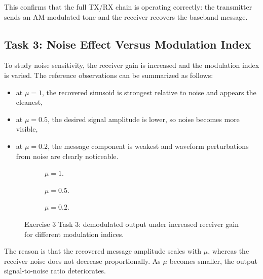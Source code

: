This confirms that the full TX/RX chain is operating correctly: the transmitter
sends an AM-modulated tone and the receiver recovers the baseband message.

\subsection{Task 3: Noise Effect Versus Modulation Index}

To study noise sensitivity, the receiver gain is increased and the modulation
index is varied. The reference observations can be summarized as follows:
\begin{itemize}
\item at $\mu = 1$, the recovered sinusoid is strongest relative to noise and
appears the cleanest,
\item at $\mu = 0.5$, the desired signal amplitude is lower, so noise becomes
more visible,
\item at $\mu = 0.2$, the message component is weakest and waveform perturbations
from noise are clearly noticeable.
\end{itemize}

\begin{figure}[H]
\centering
\begin{subfigure}{0.49\linewidth}
\centering
{}
\caption{$\mu = 1$.}
\label{fig:lab2_ex3_mu1}
\end{subfigure}
\hfill
\begin{subfigure}{0.49\linewidth}
\centering
{}
\caption{$\mu = 0.5$.}
\label{fig:lab2_ex3_mu05}
\end{subfigure}

\vspace{0.5em}

\begin{subfigure}{0.65\linewidth}
\centering
{}
\caption{$\mu = 0.2$.}
\label{fig:lab2_ex3_mu02}
\end{subfigure}
\caption{Exercise 3 Task 3: demodulated output under increased receiver gain for different modulation indices.}
\label{fig:lab2_ex3_task3}
\end{figure}

The reason is that the recovered message amplitude scales with $\mu$, whereas the
receiver noise does not decrease proportionally. As $\mu$ becomes smaller, the
output signal-to-noise ratio deteriorates.

